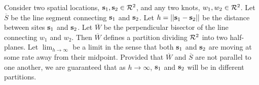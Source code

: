 Consider two spatial locations, $\mbox{\bf s}_1, \mbox{\bf s}_2 \in {\cal R}^2$, and any two knots, $w_1, w_2 \in {\cal R}^2$.
Let $\overline{S}$ be the line segment connecting $\mbox{\bf s}_1$ and $\mbox{\bf s}_2$.
Let $h = ||\mbox{\bf s}_1 - \mbox{\bf s}_2||$ be the distance between sites $\mbox{\bf s}_1$ and $\mbox{\bf s}_2$.
Let $\overline{W}$ be the perpendicular bisector of the line connecting $w_1$ and $w_2$.
Then $\overline{W}$ defines a partition dividing ${\cal R}^2$ into two half-planes.
Let $\lim_{h \rightarrow \infty}$ be a limit in the sense that both $\mbox{\bf s}_1$ and $\mbox{\bf s}_2$ are moving at some rate away from their midpoint.
Provided that $\overline{W}$ and $\overline{S}$ are not parallel to one another, we are guaranteed that as $h \rightarrow \infty$, $\mbox{\bf s}_1$ and $\mbox{\bf s}_2$ will be in different partitions.